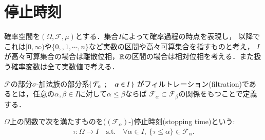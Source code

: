 \section{停止時刻}
	確率空間を$(\Omega,\mathcal{F},\mu)$とする．集合$I$によって確率過程の時点を表現し，
	以降でこれは$[0,\infty)$や$\{0,,1,\cdots,n\}$など実数の区間や高々可算集合を指すものと考え，
	$I$が高々可算集合の場合は離散位相，$\mathbb{R}$の区間の場合は相対位相を考える．また扱う確率変数は全て実数値で考える．
	\begin{itembox}[l]{}
		\begin{dfn}[フィルトレーション]
			$\mathcal{F}$の部分$\sigma$-加法族の部分系$\left\{\ \mathcal{F}_\alpha\ \, ; \quad \alpha \in I\ \right\}$
			がフィルトレーション(filtration)であるとは，任意の$\alpha,\beta \in I$に対して$\alpha \leq \beta$ならば
			$\mathcal{F}_\alpha \subset \mathcal{F}_\beta$の関係をもつことで定義する．
		\end{dfn}
	\end{itembox}
	
	\begin{itembox}[l]{}
		\begin{dfn}[停止時刻]
			$\Omega$上の関数で次を満たすものを($(\mathcal{F}_\alpha)$-)停止時刻(stopping time)という:
			\begin{align}
				\tau:\Omega \longrightarrow I\quad \mathrm{s.t.}\quad \forall \alpha \in I,\ \{ \tau \leq \alpha \} \in \mathcal{F}_\alpha.
			\end{align}
		\end{dfn}
	\end{itembox}
	
